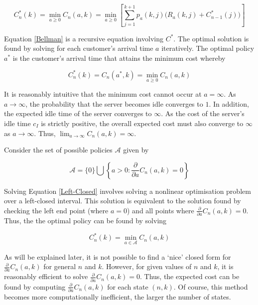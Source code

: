 \begin{equation} \label{Bellman}
	C_{n}^{*} (k) = \min_{a \geq 0} C_{n} (a, k) = \min_{a \geq 0} \left[ \sum_{j = 1}^{k + 1} p_{a} (k, j) \Big( R_{a} (k, j) + C_{n - 1}^{*} (j) \Big) \right]
\end{equation}

Equation \ref{Bellman} is a recursive equation involving $C^{*}$. The optimal solution is found by solving for each customer's arrival time $a$ iteratively. The optimal policy $a^{*}$ is the customer's arrival time that attains the minimum cost whereby

\begin{equation} \label{Left-Closed}
	C_{n}^{*} (k) = C_{n} (a^{*}, k) = \min_{a \geq 0} C_{n} (a, k)
\end{equation}

It is reasonably intuitive that the minimum cost cannot occur at $a = \infty$. As $a \to \infty$, the probability that the server becomes idle converges to $1$. In addition, the expected idle time of the server converges to $\infty$. As the cost of the server's idle time $c_{I}$ is strictly positive, the overall expected cost must also converge to $\infty$ as $a \to \infty$. Thus, $\displaystyle \lim_{a \to \infty} C_{n} (a, k) = \infty$.

Consider the set of possible policies $\mathcal{A}$ given by

\begin{equation}
	\mathcal{A} = \{ 0 \} \bigcup \left\{ a > 0 : \frac{\partial}{\partial a} C_{n} (a, k) = 0 \right\}
\end{equation}

Solving Equation \ref{Left-Closed} involves solving a nonlinear optimisation problem over a left-closed interval. This solution is equivalent to the solution found by checking the left end point (where $a = 0$) and all points where $\frac{\partial}{\partial a} C_{n} (a, k) = 0$. Thus, the the optimal policy can be found by solving

\begin{equation}
	C_{n}^{*} (k) = \min_{a \in \mathcal{A}} C_{n} (a, k)
\end{equation}

As will be explained later, it is not possible to find a `nice' closed form for $\frac{\partial}{\partial a} C_{n} (a, k)$ for general $n$ and $k$. However, for given values of $n$ and $k$, it is reasonably efficient to solve $\frac{\partial}{\partial a} C_{n} (a, k) = 0$. Thus, the expected cost can be found by computing $\frac{\partial}{\partial a} C_{n} (a, k)$ for each state $(n, k)$. Of course, this method becomes more computationally inefficient, the larger the number of states.


